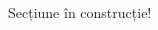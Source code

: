 \thispagestyle{empty}
\begin{multicols}{2}
[
\section*{}
]
\footnotesize {
Secțiune în construcție!
}
\end{multicols}
\restoregeometry